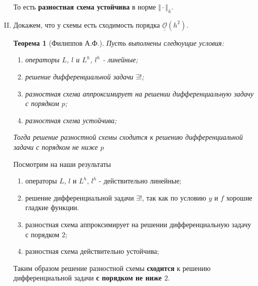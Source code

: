 \documentclass[12pt]{article}
\newtheorem*{theorem}{Теорема}
\def\bigO{ \underline{\underline{\mathcal{O}}} }
\begin{document}
\begin{enumerate}[I.]
	      То есть \textbf{разностная схема устойчива} в норме $\Vert\cdot\Vert_h$.
	      \newpage
	\item Докажем, что у схемы есть сходимость порядка $\bigO(h^2)$.
	      \begin{theorem}[Филиппов А.Ф.]
		      Пусть выполнены следюущие условия:
		      \begin{enumerate}
			      \item операторы $L$, $l$ и $L^h$, $l^h$ - линейные;
			      \item решение дифференциальной задачи $\exists!$;
			      \item разностная схема аппроксимирует на решении дифференциальную задачу с порядком $p$;
			      \item разностная схема устойчива;
		      \end{enumerate}
		      Тогда решение разностной схемы сходится к решению дифференциальной задачи с порядком не ниже $p$
	      \end{theorem}
	      Посмотрим на наши результаты
	      \begin{enumerate}
		      \item операторы $L$, $l$ и $L^h$, $l^h$ - действительно линейные;
		      \item решение дифференциальной задачи $\exists!$, так как по условию $y$ и $f$ хорошие гладкие функции.
		      \item разностная схема аппроксимирует на решении дифференциальную задачу с порядком $2$;
		      \item разностная схема действительно устойчива;
	      \end{enumerate}
	      Таким образом решение разностной схемы \textbf{сходится} к решению дифференциальной задачи \textbf{с порядком не ниже $2$}.

	      \newpage


\end{enumerate}
\end{document}
